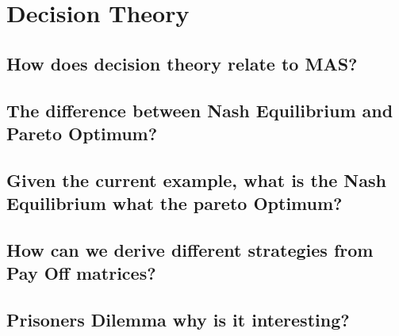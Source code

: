 \section{Decision Theory}
\subsection{How does decision theory relate to MAS?}
\subsection{The difference between Nash Equilibrium and Pareto Optimum?}
\subsection{Given the current example, what is the Nash Equilibrium what the pareto Optimum?}
\subsection{How can we derive different strategies from Pay Off matrices?}
\subsection{Prisoners Dilemma why is it interesting?}
